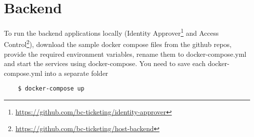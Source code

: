 \section{Backend}
To run the backend applications locally (Identity Approver\footnote{\url{https://github.com/bc-ticketing/identity-approver}} and Access Control\footnote{\url{https://github.com/bc-ticketing/host-backend}}), download the sample docker compose files from the github repos, provide the required environment variables, rename them to docker-compose.yml and start the services using docker-compose. You need to save each docker-compose.yml into a separate folder

\begin{lstlisting}
    $ docker-compose up
\end{lstlisting}